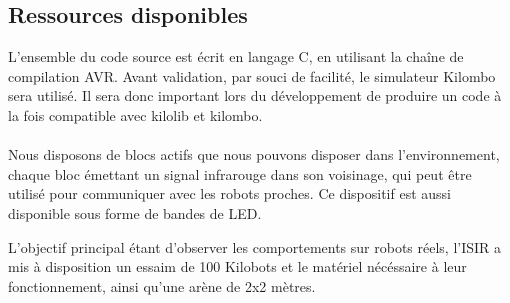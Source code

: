 \documentclass[a4paper]{article}
\begin{document}
\subsection{Ressources disponibles}

L'ensemble du code source est écrit en langage C, en utilisant la chaîne de compilation AVR. Avant validation, par souci de facilité, le simulateur Kilombo sera utilisé. Il sera donc important lors du développement de produire un code à la fois compatible avec kilolib et kilombo.
\\ \\
Nous disposons de blocs actifs que nous pouvons disposer dans l'environnement, chaque bloc émettant un signal infrarouge dans son voisinage, qui peut être utilisé pour communiquer avec les robots proches. Ce dispositif est aussi disponible sous forme de bandes de LED.

L'objectif principal étant d'observer les comportements sur robots réels, l'ISIR a mis à disposition un essaim de 100 Kilobots et le matériel nécéssaire à leur fonctionnement, ainsi qu'une arène de 2x2 mètres. 
\end{document}
